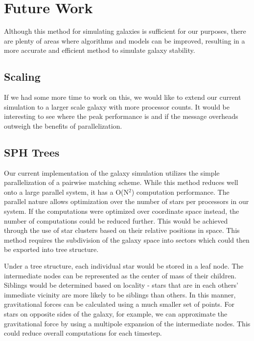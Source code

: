 \documentclass{article}
\begin{document}
\section{Future Work}

Although this method for simulating galaxies is sufficient for our purposes, there are plenty of areas where algorithms and models can be improved, resulting in a more accurate and efficient method to simulate galaxy stability.

\subsection{Scaling}

If we had some more time to work on this, we would like to extend our current simulation to a larger scale galaxy with more processor counts.  It would be interesting to see where the peak performance is and if the message overheads outweigh the benefits of parallelization.

\subsection{SPH Trees}

Our current implementation of the galaxy simulation utilizes the simple parallelization of a pairwise matching scheme. While this method reduces well onto a large parallel system, it has a O(N$^2$) computation performance. The parallel nature allows optimization over the number of stars per processors in our system.  If the computations were optimized over coordinate space instead, the number of computations could be reduced further.  This would be achieved through the use of star clusters based on their relative positions in space. This method requires the subdivision of the galaxy space into sectors which could then be exported into tree structure.

Under a tree structure, each individual star would be stored in a leaf node.  The intermediate nodes can be represented as the center of mass of their children.  Siblings would be determined based on locality - stars that are in each others' immediate vicinity are more likely to be siblings than others.  In this manner, gravitational forces can be calculated using a much smaller set of points.  For stars on opposite sides of the galaxy, for example, we can approximate the gravitational force by using a multipole expansion of the intermediate nodes. This could reduce overall computations for each timestep.
\end{document}
